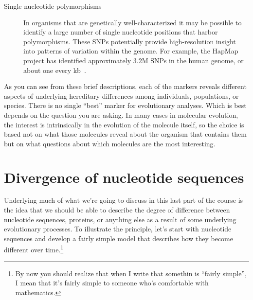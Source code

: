 \begin{description}
\item[Single nucleotide polymorphisms] In organisms that are
  genetically well-characterized it may be possible to identify a
  large number of single nucleotide positions that harbor
  polymorphisms. These SNPs potentially provide high-resolution
  insight into patterns of variation within the genome. For example,
  the HapMap project has identified approximately 3.2M SNPs in the
  human genome, or about one every kb~\cite{HapMap-2007}.

\end{description}

As you can see from these brief descriptions, each of the markers
reveals different aspects of underlying hereditary differences among
individuals, populations, or species. There is no single ``best''
marker for evolutionary analyses. Which is best depends on the
question you are asking. In many cases in molecular evolution, the
interest is intrinsically in the evolution of the molecule itself, so
the choice is based not on what those molecules reveal about the
organism that contains them but on what questions about which
molecules are the most interesting.

\section*{Divergence of nucleotide sequences}

Underlying much of what we're going to discuss in this last part of
the course is the idea that we should be able to describe the degree
of difference between nucleotide sequences, proteins, or anything else
as a result of some underlying evolutionary processes. To illustrate
the principle, let's start with nucleotide sequences and develop a
fairly simple model that describes how they become different over
time.\footnote{By now you should realize that when I write that
  somethin is ``fairly simple'', I mean that it's fairly simple to
  someone who's comfortable with mathematics.}

